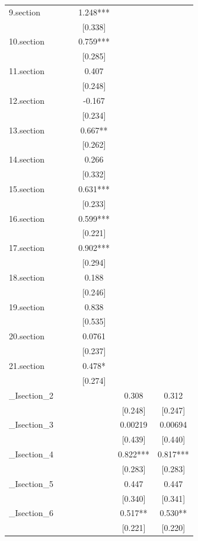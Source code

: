 \begin{tabular}{lccccc}
9.section &  &  & 1.248*** &  &  \\
 &  &  & [0.338] &  &  \\
10.section &  &  & 0.759*** &  &  \\
 &  &  & [0.285] &  &  \\
11.section &  &  & 0.407 &  &  \\
 &  &  & [0.248] &  &  \\
12.section &  &  & -0.167 &  &  \\
 &  &  & [0.234] &  &  \\
13.section &  &  & 0.667** &  &  \\
 &  &  & [0.262] &  &  \\
14.section &  &  & 0.266 &  &  \\
 &  &  & [0.332] &  &  \\
15.section &  &  & 0.631*** &  &  \\
 &  &  & [0.233] &  &  \\
16.section &  &  & 0.599*** &  &  \\
 &  &  & [0.221] &  &  \\
17.section &  &  & 0.902*** &  &  \\
 &  &  & [0.294] &  &  \\
18.section &  &  & 0.188 &  &  \\
 &  &  & [0.246] &  &  \\
19.section &  &  & 0.838 &  &  \\
 &  &  & [0.535] &  &  \\
20.section &  &  & 0.0761 &  &  \\
 &  &  & [0.237] &  &  \\
21.section &  &  & 0.478* &  &  \\
 &  &  & [0.274] &  &  \\
\_Isection\_2 &  &  &  & 0.308 & 0.312 \\
 &  &  &  & [0.248] & [0.247] \\
\_Isection\_3 &  &  &  & 0.00219 & 0.00694 \\
 &  &  &  & [0.439] & [0.440] \\
\_Isection\_4 &  &  &  & 0.822*** & 0.817*** \\
 &  &  &  & [0.283] & [0.283] \\
\_Isection\_5 &  &  &  & 0.447 & 0.447 \\
 &  &  &  & [0.340] & [0.341] \\
\_Isection\_6 &  &  &  & 0.517** & 0.530** \\
 &  &  &  & [0.221] & [0.220] \\

\end{tabular}
